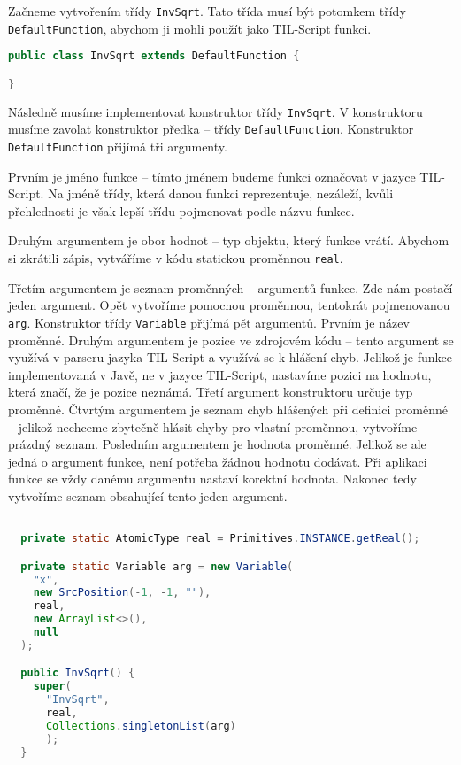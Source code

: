Začneme vytvořením třídy \lstinline{InvSqrt}. Tato třída musí být potomkem třídy
\lstinline{DefaultFunction}, abychom ji mohli použít jako TIL-Script funkci.

\begin{lstlisting}[caption={Třída InvSqrt}, language=Java]
public class InvSqrt extends DefaultFunction {

}
\end{lstlisting}

Následně musíme implementovat konstruktor třídy \lstinline{InvSqrt}. V konstruktoru musíme zavolat
konstruktor předka -- třídy \lstinline{DefaultFunction}. Konstruktor \lstinline{DefaultFunction}
přijímá tři argumenty.

Prvním je jméno funkce -- tímto jménem budeme funkci označovat v jazyce TIL-Script. Na jméně třídy,
která danou funkci reprezentuje, nezáleží, kvůli přehlednosti je však lepší třídu pojmenovat podle
názvu funkce.

Druhým argumentem je obor hodnot -- typ objektu, který funkce vrátí. Abychom si zkrátili zápis,
vytváříme v kódu statickou proměnnou \lstinline{real}.

Třetím argumentem je seznam proměnných -- argumentů funkce. Zde nám postačí jeden argument. Opět
vytvoříme pomocnou proměnnou, tentokrát pojmenovanou \lstinline{arg}. Konstruktor třídy
\lstinline{Variable} přijímá pět argumentů. Prvním je název proměnné. Druhým argumentem je pozice
ve zdrojovém kódu -- tento argument se využívá v parseru jazyka TIL-Script a využívá se k hlášení
chyb. Jelikož je funkce implementovaná v Javě, ne v jazyce TIL-Script, nastavíme pozici na hodnotu,
která značí, že je pozice neznámá. Třetí argument konstruktoru určuje typ proměnné. Čtvrtým
argumentem je seznam chyb hlášených při definici proměnné -- jelikož nechceme zbytečně hlásit chyby
pro vlastní proměnnou, vytvoříme prázdný seznam. Posledním argumentem je hodnota proměnné. Jelikož
se ale jedná o argument funkce, není potřeba žádnou hodnotu dodávat. Při aplikaci funkce se vždy
danému argumentu nastaví korektní hodnota. Nakonec tedy vytvoříme seznam obsahující tento jeden
argument.

\begin{lstlisting}[caption={Konstruktor InvSqrt}, language=Java]

  private static AtomicType real = Primitives.INSTANCE.getReal();

  private static Variable arg = new Variable(
    "x",
    new SrcPosition(-1, -1, ""),
    real,
    new ArrayList<>(),
    null
  );

  public InvSqrt() {
    super(
      "InvSqrt",
      real,
      Collections.singletonList(arg)
      );
  }
\end{lstlisting}

